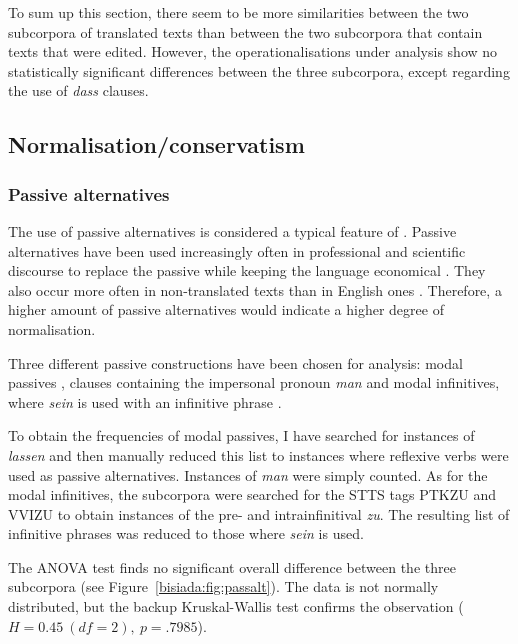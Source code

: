 \documentclass[output=paper]{LSP/langsci}
\begin{document}
\noindent To sum up this section, there seem to be more similarities between the two subcorpora of translated texts than between the two subcorpora that contain texts that were edited. However, the operationalisations under analysis show no statistically significant differences between the three subcorpora, except regarding the use of \emph{dass} clauses.

\subsection{Normalisation/conservatism}\label{bisiada:sec:norm}

\subsubsection{Passive alternatives}

The use of passive alternatives is considered a typical feature of . Passive alternatives have been used increasingly often in professional and scientific discourse to replace the passive while keeping the language economical \parencite[see][]{gang97}. They also occur more often in  non-translated texts than in English ones \parencite[181]{teich03}. Therefore, a higher amount of passive alternatives would indicate a higher degree of normalisation.

Three different passive constructions have been chosen for analysis: modal passives \parencite[combinations of \emph{lassen} (`to let') and a reflexive verb; see][162]{koegas12}, clauses containing the impersonal pronoun \emph{man} \parencites[237]{durrell03}[94]{teich03} and modal infinitives, where \emph{sein} is used with an infinitive phrase \parencites[238]{durrell03}[93]{teich03}[161]{koegas12}.

To obtain the frequencies of modal passives, I have searched for instances of \emph{lassen} and then manually reduced this list to instances where reflexive verbs were used as passive alternatives. Instances of \emph{man} were simply counted. As for the modal infinitives, the subcorpora were searched for the STTS tags PTKZU and VVIZU to obtain instances of the pre- and intrainfinitival \emph{zu}. The resulting list of infinitive phrases was reduced to those where \emph{sein} is used.

The ANOVA test finds no significant overall difference between the three subcorpora (see Figure~\ref{bisiada:fig:passalt}). The data is not normally distributed, but the backup Kruskal-Wallis test confirms the observation ($H=0.45~(df=2),~p=.7985$).
\end{document}
